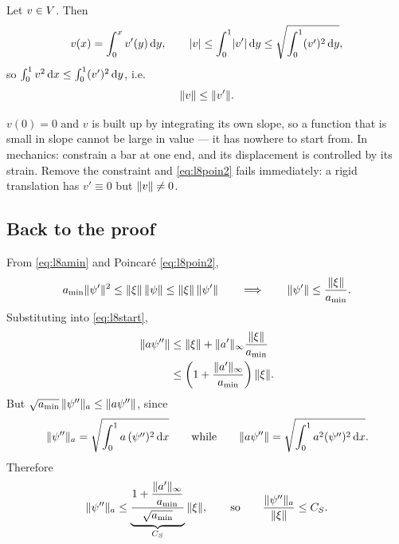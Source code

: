 Let $v\in V$. Then
\begin{equation}\label{eq:l8poin}
  v(x)=\int_0^{x} v'(y)\,\mathrm{d}y,
  \qquad
  \lvert v\rvert\le\int_0^1\lvert v'\rvert\,\mathrm{d}y
          \le\sqrt{\int_0^1 (v')^{2}\,\mathrm{d}y},
\end{equation}
so $\int_0^1 v^{2}\,\mathrm{d} x\le\int_0^1(v')^{2}\,\mathrm{d}y$, i.e.
\begin{equation}\label{eq:l8poin2}
  \lVert v\rVert\le\lVert v'\rVert .
\end{equation}

\begin{mechanics}
$v(0)=0$ and $v$ is built up by integrating its own slope, so a function that is
small in slope cannot be large in value --- it has nowhere to start from. In
mechanics: constrain a bar at one end, and its displacement is controlled by its
strain. Remove the constraint and \eqref{eq:l8poin2} fails immediately: a rigid
translation has $v'\equiv0$ but $\lVert v\rVert\neq0$.
\end{mechanics}

\subsection*{Back to the proof}

From \eqref{eq:l8amin} and Poincar\'e \eqref{eq:l8poin2},
\begin{equation}\label{eq:l8back}
  a_{\min}\lVert\psi'\rVert^{2}\le\lVert\xi\rVert\,\lVert\psi\rVert\le\lVert\xi\rVert\,\lVert\psi'\rVert
  \qquad\Longrightarrow\qquad
  \lVert\psi'\rVert\le\frac{\lVert\xi\rVert}{a_{\min}} .
\end{equation}
Substituting into \eqref{eq:l8start},
\begin{align}
  \lVert a\psi''\rVert &\le \lVert\xi\rVert+\lVert a'\rVert_{\infty}\frac{\lVert\xi\rVert}{a_{\min}}
   \notag\\
                 &\le \left(1+\frac{\lVert a'\rVert_{\infty}}{a_{\min}}\right)\lVert\xi\rVert.
   \label{eq:l8apsi}
\end{align}
But $\sqrt{a_{\min}}\,\lVert\psi''\rVert_{a}\le\lVert a\psi''\rVert$, since
\begin{equation}\label{eq:l8two}
  \lVert\psi''\rVert_{a}=\sqrt{\int_0^1 a\,(\psi'')^{2}\,\mathrm{d} x}
  \qquad\text{while}\qquad
  \lVert a\psi''\rVert=\sqrt{\int_0^1 a^{2}(\psi'')^{2}\,\mathrm{d} x}.
\end{equation}
Therefore
\begin{equation}\label{eq:l8CSdef}
  \lVert\psi''\rVert_{a}\le
   \underbrace{\frac{1+\dfrac{\lVert a'\rVert_{\infty}}{a_{\min}}}{\sqrt{a_{\min}}}}_{C_{S}}
   \,\lVert\xi\rVert,
  \qquad\text{so}\qquad
  \frac{\lVert\psi''\rVert_{a}}{\lVert\xi\rVert}\le C_{S}.
\end{equation}

